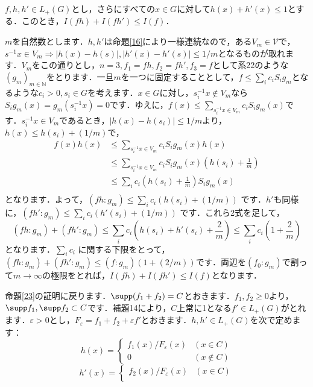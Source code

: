 \begin{Proof}
\begin{lem}\label{24}
$f, h, h'\in L_{+}(G)$とし，さらにすべての$x \in G$に対して$h(x)+h'(x) \le 1$とする．このとき，$I(fh)+I(fh') \le I(f)$．
\end{lem}
\begin{Proof}
$m$を自然数とします．$h,h'$は命題\ref{16}により一様連続なので，ある$V_m \in \mathscr{V}$で，$s^{-1}x \in V_{m} \Rightarrow |h(x)-h(s)|, |h'(x)-h'(s)| \le 1/m$となるものが取れます．$V_m$をこの通りとし，$n=3, f_1=fh, f_2=fh', f_3=f$として系22のような$(g_m)_{m \in \mathbb{N}}$をとります．一旦$m$を一つに固定することとして，$f \le \sum_{i}c_i S_{i}g_m$となるような$c_i>0, s_i \in G$を考えます．$x \in G$に対し，$s_{i}^{-1}x \not\in V_m$なら$S_{i}g_{m}(x)=g_{m}(s_{i}^{-1}x)=0$です．ゆえに，$f(x) \le \sum_{s_{i}^{-1}x \in V_m} c_{i}S_{i}g_{m}(x)$です．$s_{i}^{-1}x \in V_m$であるとき，$|h(x)-h(s_i)| \le 1/m$より，$h(x) \le h(s_i)+(1/m)$で，
\begin{align*}
f(x)h(x)  & \le \sum_{s_{i}^{-1}x \in V_m} c_{i}S_{i}g_{m}(x)h(x) \\
& \le \sum_{s_{i}^{-1}x \in V_m} c_{i}S_{i}g_{m}(x) \left( h(s_i)+\frac{1}{m} \right) \\
& \le \sum_{i}c_{i} \left( h(s_i)+\frac{1}{m} \right) S_{i}g_{m}(x) \\
\end{align*}
となります．よって，$( fh \colon g_m ) \le \sum_{i}c_{i} ( h(s_i)+(1/m) )$ です．$h'$も同様に，$( fh' \colon g_m ) \le \sum_{i}c_{i} ( h'(s_i)+(1/m) )$ です．これら2式を足して，
\[
( fh \colon g_m )+( fh' \colon g_m ) \le \sum_{i}c_{i} \left( h(s_i)+h'(s_i)+\frac{2}{m} \right) \le \sum_{i}c_{i} \left( 1+\frac{2}{m} \right)
\]
となります．$\sum_{i}c_{i}$ に関する下限をとって，$( fh \colon g_m )+( fh' \colon g_m ) \le ( f \colon g_m ) ( 1+(2/m) )$です．両辺を$(f_0 \colon g_m)$で割って$m \to \infty$の極限をとれば，$I(fh)+I(fh') \le I(f)$となります．　
\end{Proof}
命題\ref{23}の証明に戻ります．$\supp (f_{1}+f_{2})=C$とおきます．$f_1, f_2 \ge 0$より，$\supp f_1, \supp f_2 \subset C$です．補題14により，$C$上常に1となる$f' \in L_{+}(G)$がとれます．$\varepsilon>0$とし，$F_{\varepsilon}=f_{1}+f_{2}+\varepsilon f'$とおきます．$h,h' \in L_{+}(G)$を次で定めます：
\[
h(x)=
\begin{cases}
f_{1}(x)/F_{\varepsilon}(x) & (x \in C) \\
0 & (x \not\in C)
\end{cases}
\]
\[
h'(x)=
\begin{cases}
f_{2}(x)/F_{\varepsilon}(x) & (x \in C) \\

\end{cases}\]
\end{Proof}
